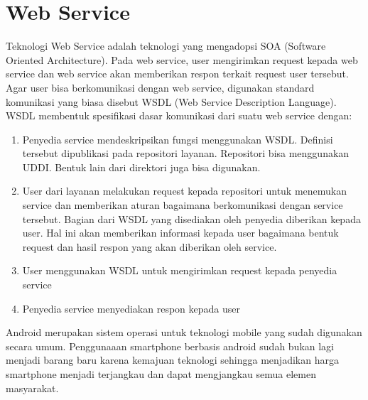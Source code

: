 \section{Web Service}
Teknologi Web Service adalah teknologi yang mengadopsi SOA (Software Oriented Architecture). Pada web service, user mengirimkan request kepada web service dan web service akan memberikan respon terkait request user tersebut. Agar user bisa berkomunikasi dengan web service, digunakan standard komunikasi yang biasa disebut WSDL (Web Service Description Language). WSDL membentuk spesifikasi dasar komunikasi dari suatu web service dengan:
\begin{enumerate}
	\item Penyedia service mendeskripsikan fungsi menggunakan WSDL. Definisi tersebut dipublikasi pada repositori layanan. Repositori bisa menggunakan UDDI. Bentuk lain dari direktori juga bisa digunakan.
	\item User dari layanan melakukan request kepada repositori untuk menemukan service dan memberikan aturan bagaimana berkomunikasi dengan service tersebut. Bagian dari WSDL yang disediakan oleh penyedia diberikan kepada user. Hal ini akan memberikan informasi kepada user bagaimana bentuk request dan hasil respon yang akan diberikan oleh service.
	\item User menggunakan WSDL untuk mengirimkan request kepada penyedia service
	\item Penyedia service menyediakan respon kepada user
\end{enumerate}

Android merupakan sistem operasi untuk teknologi mobile yang sudah digunakan secara umum. Penggunaaan smartphone berbasis android sudah bukan lagi menjadi barang baru karena kemajuan teknologi sehingga menjadikan harga smartphone menjadi terjangkau dan dapat mengjangkau semua elemen masyarakat.


